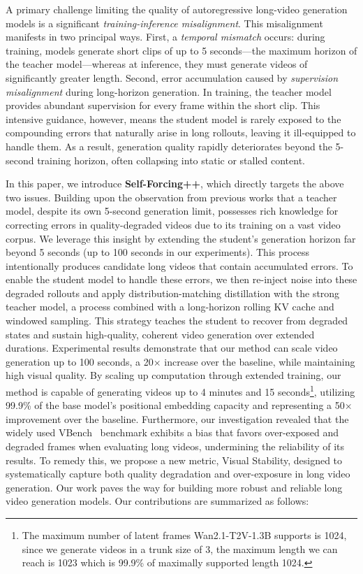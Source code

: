 A primary challenge limiting the quality of autoregressive long-video generation models is a significant \textit{training-inference misalignment}. This misalignment manifests in two principal ways. First, a \textit{temporal mismatch} occurs: during training, models generate short clips of up to 5 seconds—the maximum horizon of the teacher model—whereas at inference, they must generate videos of significantly greater length. Second, error accumulation caused by \textit{supervision misalignment} during long-horizon generation. In training, the teacher model provides abundant supervision for every frame within the short clip. This intensive guidance, however, means the student model is rarely exposed to the compounding errors that naturally arise in long rollouts, leaving it ill-equipped to handle them. As a result, generation quality rapidly deteriorates beyond the 5-second training horizon, often collapsing into static or stalled content.

In this paper, we introduce \textbf{Self-Forcing++}, which directly targets the above two issues. Building upon the observation from previous works \citep{bruce2024genie,alonso2024diffusion,li2025hunyuan} that a teacher model, despite its own 5-second generation limit, possesses rich knowledge for correcting errors in quality-degraded videos due to its training on a vast video corpus. We leverage this insight by extending the student's generation horizon far beyond 5 seconds (up to 100 seconds in our experiments). This process intentionally produces candidate long videos that contain accumulated errors. To enable the student model to handle these errors, we then re-inject noise into these degraded rollouts and apply distribution-matching distillation with the strong teacher model, a process combined with a long-horizon rolling KV cache and windowed sampling. This strategy teaches the student to recover from degraded states and sustain high-quality, coherent video generation over extended durations.
Experimental results demonstrate that our method can scale video generation up to 100 seconds, a 20$\times$ increase over the baseline, while maintaining high visual quality. By scaling up computation through extended training, our method is capable of generating videos up to 4 minutes and 15 seconds\footnote{The maximum number of latent frames Wan2.1-T2V-1.3B supports is 1024, since we generate videos in a trunk size of 3, the maximum length we can reach is 1023 which is 99.9\% of maximally supported length 1024.}, utilizing 99.9\% of the base model's positional embedding capacity and representing a 50$\times$ improvement over the baseline.
Furthermore, our investigation revealed that the widely used VBench~\citep{huang2024vbench} benchmark exhibits a bias that favors over-exposed and degraded frames when evaluating long videos, undermining the reliability of its results. To remedy this, we propose a new metric, Visual Stability, designed to systematically capture both quality degradation and over-exposure in long video generation. Our work paves the way for building more robust and reliable long video generation models.
Our contributions are summarized as follows:


